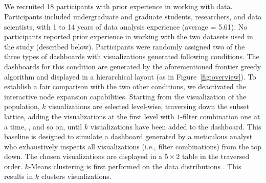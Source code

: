 \subsection{}
We recruited 18 participants 
with prior experience in working with data.
Participants included undergraduate
and graduate students, researchers,
and data scientists, with 1 to 14 years of data
analysis experience (average = 5.61).
No participants reported prior experience
in working with the two datasets used in the study (described below).
Participants were randomly assigned two
of the three types of dashboards with 
visualizations generated 
following conditions.
\stitle{\system:} The dashboards for this condition
are generated by the aforementioned
frontier greedy algorithm and displayed
in a hierarchical layout (as in Figure~\ref{fig:overview}).
To establish a fair comparison
with the two other conditions,
we deactivated 
the interactive node expansion capabilities.
Starting from the visualization of the  population,
$k$ visualizations are selected level-wise,
traversing down the subset lattice,
adding the visualizations at the first level
with $1$-filter combination one at a time,
,
and so on,
until $k$ visualizations have been added to the dashboard.
This baseline is designed to simulate a dashboard
generated by a meticulous analyst who exhaustively
inspects all visualizations (i.e., filter combinations)
from the top down.
The chosen visualizations are displayed
in a $5\times2$ table in the traversed order.
\stitle{\cluster:} 
$k$-Means clustering is first performed on the data distributions
.
This results in $k$ clusters 
visualizations.
